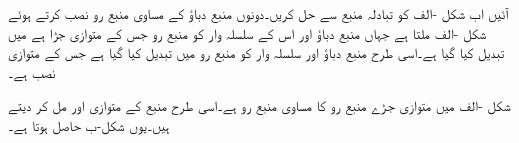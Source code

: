 %  

آئیں اب شکل -الف کو تبادلہ منبع سے حل کریں۔دونوں منبع دباؤ کے مساوی منبع رو نصب کرتے ہوئے شکل -الف ملتا ہے جہاں منبع دباؤ  اور اس کے سلسلہ وار  کو منبع رو  جس کے متوازی  جڑا ہے میں تبدیل کیا گیا ہے۔اسی طرح منبع دباؤ  اور سلسلہ وار  کو منبع رو  میں تبدیل کیا گیا ہے جس کے متوازی  نصب ہے۔

شکل -الف میں متوازی جڑے منبع رو کا مساوی منبع رو  ہے۔اسی طرح منبع کے متوازی  اور  مل کر  دیتے ہیں۔یوں شکل-ب حاصل ہوتا ہے۔

